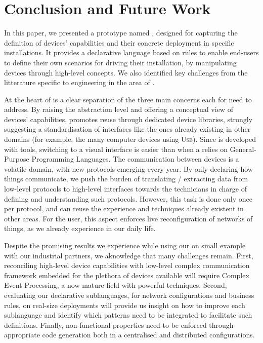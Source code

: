 \section{Conclusion and Future Work}
\label{sec:Conclusion}

In this paper, we presented a prototype \DSL named \IOTDSL, designed for capturing the definition of devices' capabilities and their concrete deployment in specific installations. It provides a declarative language based on rules to enable end-users to define their own scenarios for driving their installation, by manipulating devices through high-level concepts. We also identified key challenges from the litterature specific to \DSL engineering in the area of \IOT. 

At the heart of \IOTDSL is a clear separation of the three main concerns each \DSL for \IOT need to address. By raising the abstraction level and offering a conceptual view of devices' capabilities, \IOTDSL promotes reuse through dedicated device libraries, strongly suggesting a standardisation of interfaces like the ones already existing in other domains (for example, the many computer devices using \textsc{Usb}). Since \IOTDSL is developed with \MDE tools, switching to a visual interface is easier than when a \DSL relies on General-Purpose Programming Languages. The communication between devices is a volatile domain, with new protocols emerging every year. By only declaring how things communicate, we push the burden of translating / extracting data from low-level protocols to high-level interfaces towards the technicians in charge of defining and understanding such protocols. However, this task is done only once per protocol, and can reuse the experience and techniques already existent in other areas. For the user, this aspect enforces live reconfiguration of networks of things, as we already experience in our daily life. 

Despite the promising results we experience while using our \DSL on small example with our industrial partners, we aknowledge that many challenges remain. First, reconciling high-level device capabilities with low-level complex communication framework embedded for the plethora of devices available will require Complex Event Processing, a now mature field with powerful techniques. Second, evaluating our declarative sublanguages, for network configurations and business rules, on real-size deployments will provide us insight on how to improve each sublanguage and identify which patterns need to be integrated to facilitate such definitions. Finally, non-functional properties need to be enforced through appropriate code generation both in a centralised and distributed configurations.

